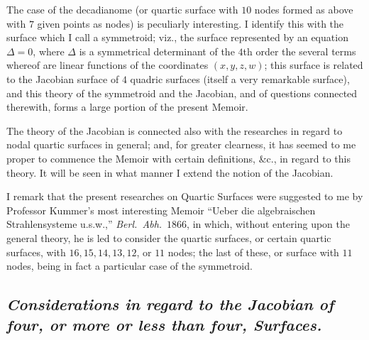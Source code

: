 \documentclass[11pt,a4paper]{article}
\begin{document}
\medskip

The case of the decadianome (or quartic surface with $10$ nodes formed as above with $7$
given points as nodes) is peculiarly interesting. I identify this with the surface which
I call a symmetroid; viz., the surface represented by an equation $\Delta = 0$, where
$\Delta$ is a symmetrical determinant of the $4$th order the several terms whereof are
linear functions of the coordinates $(x, y, z, w)$; this surface is related to the Jacobian
surface of $4$ quadric surfaces (itself a very remarkable surface), and this theory of the
symmetroid and the Jacobian, and of questions connected therewith, forms a large portion of
the present Memoir.

\medskip

The theory of the Jacobian is connected also with the researches in regard to nodal quartic
surfaces in general; and, for greater clearness, it has seemed to me proper to commence the
Memoir with certain definitions, \&c., in regard to this theory. It will be seen in what
manner I extend the notion of the Jacobian.

\medskip

I remark that the present researches on Quartic Surfaces were suggested to me by Professor
Kummer's most interesting Memoir ``Ueber die algebraischen Strahlensysteme u.s.w.,''
\textit{Berl.\ Abh.}\ $1866$, in which, without entering upon the general theory, he is led
to consider the quartic surfaces, or certain quartic surfaces, with $16, 15, 14, 13, 12$,
or $11$ nodes; the last of these, or surface with $11$ nodes, being in fact a particular
case of the symmetroid.

\bigskip

\subsection*{\textit{Considerations in regard to the Jacobian of four, or more or less than four, Surfaces.}}
\end{document}
